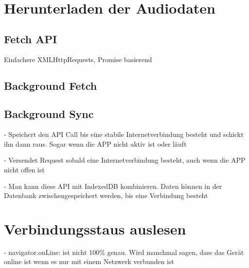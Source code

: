 \section{Herunterladen der Audiodaten}

\subsection{Fetch API}

Einfachere XMLHttpRequests, Promise basierend
\autocite{Rojas2020}

\subsection{Background Fetch}

\subsection{Background Sync}

- Speichert den API Call bis eine stabile Internetverbindung besteht und schickt ihn dann raus. Sogar wenn die APP nicht aktiv ist oder läuft \autocite{Sheppard2017}

- Versendet Request sobald eine Internetverbindung besteht, auch wenn die APP nicht offen ist \autocite{Rojas2020}

- Man kann diese API mit IndexedDB kombinieren. Daten können in der Datenbank zwischengespeichert werden, bis eine Verbindung besteht \autocite{Rojas2020}

\section{Verbindungsstaus auslesen}

- navigator.onLine: ist nicht 100\% genau. Wird manchmal sagen, dass das Gerät online ist wenn es nur mit einem Netzwerk verbunden ist \autocite{Sheppard2017}


